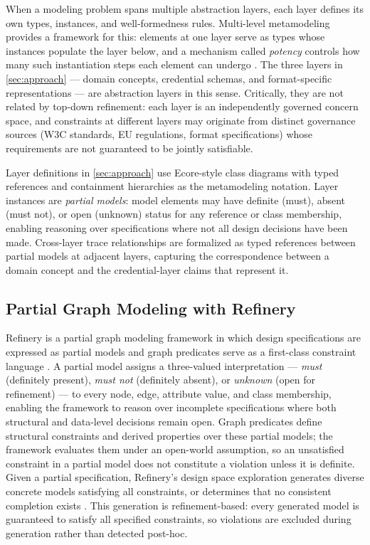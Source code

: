 When a modeling problem spans multiple abstraction layers, each layer defines its own types, instances, and well-formedness rules. Multi-level metamodeling \citep{goos_essence_2001} provides a framework for this: elements at one layer serve as types whose instances populate the layer below, and a mechanism called \emph{potency} controls how many such instantiation steps each element can undergo \citep{goos_essence_2001}. The three layers in \autoref{sec:approach} --- domain concepts, credential schemas, and format-specific representations --- are abstraction layers in this sense. Critically, they are not related by top-down refinement: each layer is an independently governed concern space, and constraints at different layers may originate from distinct governance sources (W3C standards, EU regulations, format specifications) whose requirements are not guaranteed to be jointly satisfiable.

Layer definitions in \autoref{sec:approach} use Ecore-style class diagrams with typed references and containment hierarchies as the metamodeling notation. Layer instances are \emph{partial models}: model elements may have definite (must), absent (must not), or open (unknown) status for any reference or class membership, enabling reasoning over specifications where not all design decisions have been made. Cross-layer trace relationships are formalized as typed references between partial models at adjacent layers, capturing the correspondence between a domain concept and the credential-layer claims that represent it.


\subsection{Partial Graph Modeling with Refinery}\label{partial-graph-modeling-with-refinery}

\label{sec:refinery}

Refinery is a partial graph modeling framework in which design specifications are expressed as partial models and graph predicates serve as a first-class constraint language \citep{marussy_refinery_2024}. A partial model assigns a three-valued interpretation --- \emph{must} (definitely present), \emph{must not} (definitely absent), or \emph{unknown} (open for refinement) --- to every node, edge, attribute value, and class membership, enabling the framework to reason over incomplete specifications where both structural and data-level decisions remain open. Graph predicates define structural constraints and derived properties over these partial models; the framework evaluates them under an open-world assumption, so an unsatisfied constraint in a partial model does not constitute a violation unless it is definite. Given a partial specification, Refinery's design space exploration generates diverse concrete models satisfying all constraints, or determines that no consistent completion exists \citep{semerathGraphSolverAutomated2018}. This generation is refinement-based: every generated model is guaranteed to satisfy all specified constraints, so violations are excluded during generation rather than detected post-hoc.

